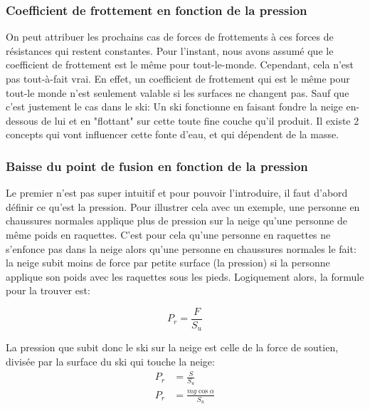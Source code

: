 \documentclass{article}
\begin{document}
\vspace{0.3cm}


\subsubsection{Coefficient de frottement en fonction de la pression}

On peut attribuer les prochains cas de forces de frottements à ces forces de résistances qui restent constantes. 
\newline Pour l'instant, nous avons assumé que le coefficient de frottement est le même pour tout-le-monde. Cependant, cela n'est pas tout-à-fait vrai. 
\newline En effet, un coefficient de frottement qui est le même pour tout-le monde n'est seulement valable si les surfaces ne changent pas. Sauf que c'est justement le cas dans le ski: Un ski fonctionne en faisant fondre la neige en-dessous de lui et en "flottant" sur cette toute fine couche qu'il produit. 
\newline Il existe 2 concepts qui vont influencer cette fonte d'eau, et qui dépendent de la masse.

\subsubsection{Baisse du point de fusion en fonction de la pression}

Le premier n'est pas super intuitif et pour pouvoir l'introduire, il faut d'abord définir ce qu'est la pression.
\newline Pour illustrer cela avec un exemple, une personne en chaussures normales applique plus de pression sur la neige qu'une personne de même poids en raquettes. C'est pour cela qu'une personne en raquettes ne s'enfonce pas dans la neige alors qu'une personne en chaussures normales le fait: la neige subit moins de force par petite surface (la pression) si la personne applique son poids avec les raquettes sous les pieds. Logiquement alors, la formule pour la trouver est:

\begin{equation}
    \label{Pression}
    P_r = \frac{F}{S_u}    
\end{equation}

La pression que subit donc le ski sur la neige est celle de la force de soutien, divisée par la surface du ski qui touche la neige:
\begin{align}
    \nonumber
    P_r &= \frac{S}{S_u} \\
    P_r &= \frac{mg\cos{\alpha}}{S_u}
\end{align}
\end{document}
